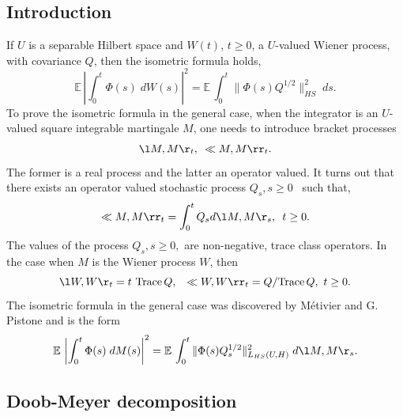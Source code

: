\documentclass[preprint]{imsart}
\def\E{\mathbb E}
\begin{document}
{\subsection{Introduction}
If $U$ is  a separable Hilbert space
and  $W(t)$, $t\ge0$, a $U$-valued Wiener process, with covariance
$Q$, then the   isometric formula holds,
$$
  \E\,\left|\int_0^t \Phi(s)\; dW(s)\right|^2
  =\E\,\int_0^t \|\Phi(s)Q^{1/2}\|_{HS}^2\; ds.
  $$
 To prove  the isometric formula in the general case, when the integrator is an $U$- valued square integrable
 martingale $M$, one needs to introduce bracket processes
$$
\l M, M \r _t,\,\,\, \ll M, M \rr _{t}.
$$
The former  is a real process  and the
latter an  operator valued. It turns out that there
exists an operator valued stochastic process $Q_s, s\geq 0$ \, such that,
\begin{equation}\label{mp1}
\ll M, M \rr _t = \int_{0}^{t} Q_{s} d \l M, M \r _s,\,\,\,t\geq 0.
\end{equation}
The values of the process $Q_s, s\geq 0,$ are non-negative, trace class operators.
In the case when $M$ is the Wiener process $W$, then
$$
\l W, W \r _t = t\,\, {\rm Trace}\, Q,\,\,\,\,\,  \ll W, W \rr _t = Q/{\rm Trace}\, Q,\,\,t\geq 0.
$$
The isometric formula in the general case was discovered by  M\'etivier and G. Pistone \cite{metivier1} and is the form
\begin{equation}\label{mp2}
  \E\,\left|\int_0^t \Phi(s)\; dM(s)\right|^2
  =\E\,\int_0^t \|\Phi(s)Q_s^{1/2}\|_{L_{HS}(U, H)}^2\; d\l M, M \r _s.
\end{equation}



\subsection{Doob-Meyer decomposition}


}
\end{document}
